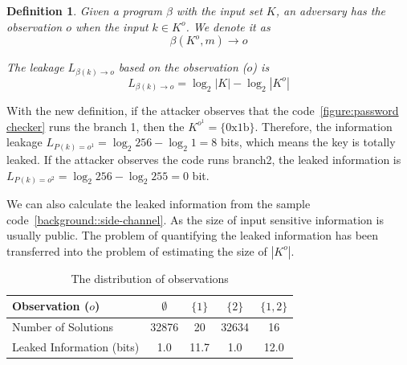 \newtheorem{mydef}{Definition}

\begin{mydef}
\label{def}
Given a program $\beta$ with the input set $K$, 
an adversary has the observation $o$ when the input $k{\in}K^o$. 
We denote it as
$$\beta(K^o, m) \rightarrow	o$$

The leakage $L_{\beta(k)\rightarrow o}$ based on the observation ($o$) is
    $$L_{\beta(k)\rightarrow o} = \log_2{|K|} - \log_2{|K^o|}$$
\end{mydef}

With the new definition, if the attacker observes that the code~\ref{figure:password checker} runs the branch 1, 
then the $K^{o^{1}} = \{\mathrm{0x1b}\}$. Therefore, the information leakage $L_{P(k)=o^{1}} = \log_2{256} - \log_2{1} = 8$
bits, which means the key is totally leaked. If the attacker observes the code runs branch2, the leaked information is 
$L_{P(k)=o^{2}} = \log_2{256} - \log_2{255} = 0$ bit.


We can also calculate the leaked information
from the sample code~\ref{background::side-channel}. As the size of input 
sensitive information is usually public. The problem of quantifying the
leaked information has been transferred into the problem of estimating
the size of $|K^o|$.

\begin{table}[ht]
    \centering


\begin{tabular}{l|cccc}
    \hline
Observation ($o$)  & $\emptyset$ & ${\{1\}}$ & ${\{2\}}$ & ${\{1, 2\}}$ \\ \hline
Number of Solutions &  32876 & 20 & 32634 & 16 \\ \hline
Leaked Information (bits)     & 1.0 & 11.7 & 1.0  & 12.0   \\
    \hline
\end{tabular}
\caption{The distribution of observations}
\label{shtable}
\end{table}

